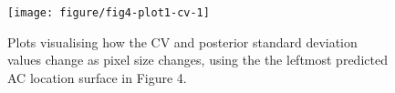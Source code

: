 \documentclass[10pt,a4paper]{article}\usepackage[]{graphicx}\usepackage[]{xcolor}
\makeatletter
\def\maxwidth{ %
  \ifdim\Gin@nat@width>\linewidth
    \linewidth
  \else
    \Gin@nat@width
  \fi
}
\newenvironment{knitrout}{}{} %
\makeatother
\begin{document}
\begin{knitrout}
\color{fgcolor}\begin{figure}
\texttt{[image: figure/fig4-plot1-cv-1]} \caption[Plots visualising how the CV and posterior standard deviation values change as pixel size changes, using the the leftmost predicted AC location surface in Figure 4]{Plots visualising how the CV and posterior standard deviation values change as pixel size changes, using the the leftmost predicted AC location surface in Figure 4.}\label{fig:fig4-plot1-cv}
\end{figure}

\end{knitrout}



\end{document}
